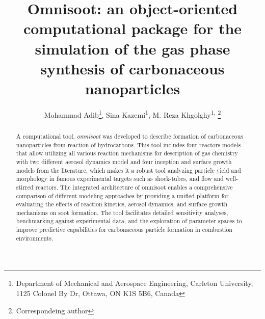 	\title{\renewcommand\baselinestretch{1}\bf
		Omnisoot: an object-oriented computational package for the simulation of the gas phase synthesis of carbonaceous nanoparticles
		}
	\renewcommand\baselinestretch{0.8}
	\author{
	Mohammad Adib\footnote{\scriptsize{Department of Mechanical and Aerospace Engineering, Carleton University, 1125 Colonel By Dr, Ottawa, ON K1S 5B6, Canada}},
	Sina Kazemi\textsuperscript{1}{\vspace{0.4em}},  
	M. Reza Khgolghy\textsuperscript{1, }\footnote{\scriptsize{Correspondeing author}} 
}
	\date{}
	\maketitle
	\renewcommand\baselinestretch{1.3}
	
	\begin{abstract}
	A computational tool, \textit{omnisoot} was developed to describe formation of carbonaceous nanoparticles from reaction of hydrocarbons. This tool includes four reactors models that allow utilizing all various reaction mechanisms for description of gas chemistry with two different aerosol dynamics model and four inception and surface growth models from the literature, which makes it a robust tool analyzing particle yield and morphology in famous experimental targets such as shock-tubes, and flow and well-stirred reactors. The integrated architecture of omnisoot enables a comprehensive comparison of different modeling approaches by providing a unified platform for evaluating the effects of reaction kinetics, aerosol dynamics, and surface growth mechanisms on soot formation. The tool facilitates detailed sensitivity analyses, benchmarking against experimental data, and the exploration of parameter spaces to improve predictive capabilities for carbonaceous particle formation in combustion environments.
		
	\end{abstract}
	